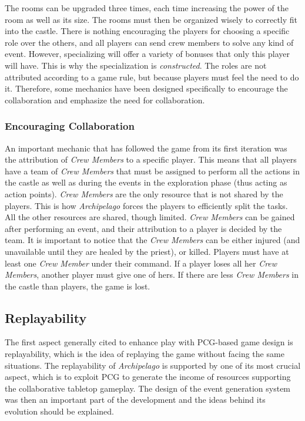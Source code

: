 The rooms can be upgraded three times, each time increasing the power of the room as well as its size. The rooms must then be organized wisely to correctly fit into the castle. 
There is nothing encouraging the players for choosing a specific role over the others, and all players can send crew members to solve any kind of event. However, specializing will offer a variety of bonuses that only this player will have. This is why the specialization is \textit{constructed}. The roles are not attributed according to a game rule, but because players must feel the need to do it. Therefore, some mechanics have been designed specifically to encourage the collaboration and emphasize the need for collaboration.
\subsubsection{Encouraging Collaboration} 
An important mechanic that has followed the game from its first iteration was the attribution of \textit{Crew Members} to a specific player. This means that all players have a team of \textit{Crew Members} that must be assigned to perform all the actions in the castle as well as during the events in the exploration phase (thus acting as action points). \textit{Crew Members} are the only resource that is not shared by the players. This is how \textit{Archipelago} forces the players to efficiently split the tasks. All the other resources are shared, though limited. \textit{Crew Members} can be gained after performing an event, and their attribution to a player is decided by the team. It is important to notice that the \textit{Crew Members} can be either injured (and unavailable until they are healed by the priest), or killed. Players must have at least one \textit{Crew Member} under their command. If a player loses all her \textit{Crew Members}, another player must give one of hers. If there are less \textit{Crew Members} in the castle than players, the game is lost.
\subsection{Replayability} 
The first aspect generally cited to enhance play with PCG-based game design is replayability, which is the idea of replaying the game without facing the same situations. The replayability of \textit{Archipelago} is supported by one of its most crucial aspect, which is to exploit PCG to generate the income of resources supporting the collaborative tabletop gameplay. The design of the event generation system was then an important part of the development and the ideas behind its evolution should be explained.
